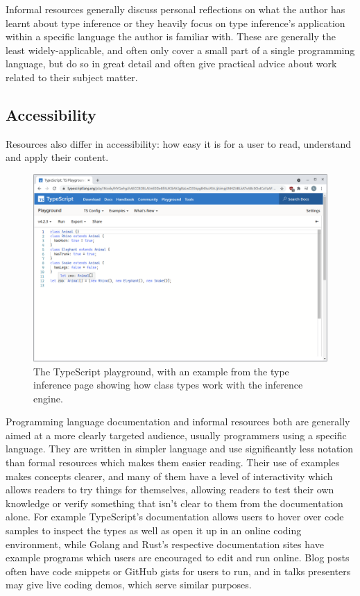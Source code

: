 \documentclass[a4paper,fleqn,oneside,12pt]{report}
\begin{document}
Informal resources generally discuss personal reflections on what the author has learnt about type inference or they heavily focus on type inference's application within a specific language the author is familiar with. These are generally the least widely-applicable, and often only cover a small part of a single programming language, but do so in great detail and often give practical advice about work related to their subject matter.

\subsection{Accessibility}

Resources also differ in accessibility: how easy it is for a user to read, understand and apply their content.

\begin{figure}[h!]
  \centering
  \includegraphics[width=\linewidth]{images/image8.png}
  \caption{The TypeScript playground, with an example from the type inference page showing how class types work with the inference engine.}
\end{figure}

Programming language documentation and informal resources both are generally aimed at a more clearly targeted audience, usually programmers using a specific language. They are written in simpler language and use significantly less notation than formal resources which makes them easier reading. Their use of examples makes concepts clearer, and many of them have a level of interactivity which allows readers to try things for themselves, allowing readers to test their own knowledge or verify something that isn’t clear to them from the documentation alone. For example TypeScript's documentation allows users to hover over code samples to inspect the types as well as open it up in an online coding environment, while Golang and Rust's respective documentation sites have example programs which users are encouraged to edit and run online. Blog posts often have code snippets or GitHub gists for users to run, and in talks presenters may give live coding demos, which serve similar purposes.
\end{document}
